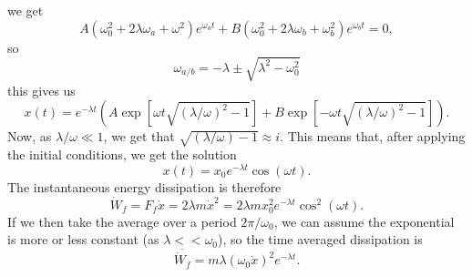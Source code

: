 \documentclass{article}
\begin{document}
        we get
        \begin{equation*}
            A(\omega_0^2 + 2 \lambda \omega_a + \omega^2)e^{\omega_a t} + B(\omega_0^2 + 2 \lambda \omega_b + \omega_b^2)e^{\omega_b t} = 0,
        \end{equation*}
        so
        \begin{equation*}
            \omega_{a/b} = -\lambda \pm \sqrt{\lambda^2 - \omega_0^2}
        \end{equation*}
        this gives us
        \begin{equation*}
            x(t) = e^{-\lambda t} \left( A \exp \left[\omega t \sqrt{(\lambda / \omega)^2 - 1} \right] + B \exp \left[- \omega t \sqrt{(\lambda / \omega)^2 - 1} \right] \right).
        \end{equation*}
        Now, as $\lambda/\omega \ll 1$, we get that $\sqrt{(\lambda / \omega) - 1} \approx i$. This means that, after applying the initial conditions, we get the solution
        \begin{equation*}
            x(t) = x_0 e^{-\lambda t} \cos(\omega t).
        \end{equation*}
        The instantaneous energy dissipation is therefore 
        \begin{equation*}
            \dot W_f = F_f \dot x = 2 \lambda m \dot x^2 = 2 \lambda m x_0^2 e^{-\lambda t} \cos^2(\omega t).
        \end{equation*}
        If we then take the average over a period $2 \pi / \omega_0$, we can assume the exponential is more or less constant (as $\lambda << \omega_0$), so the time averaged dissipation is 
        \begin{equation*}
            \overline{\dot W_f} = m \lambda (\omega_0 \dot x)^2 e^{-\lambda t}.
        \end{equation*}
\end{document}
